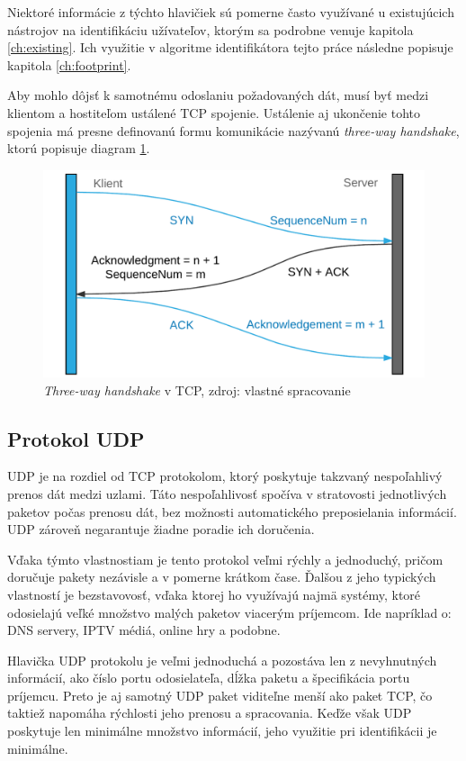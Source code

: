 \documentclass[
  digital, %
  table,   %
  lof,     %
  nolot,   %
  nocover
]{fithesis3}
\begin{document}
Niektoré informácie z týchto hlavičiek sú pomerne často využívané u existujúcich
nástrojov na identifikáciu užívateľov, ktorým sa podrobne venuje kapitola
\ref{ch:existing}. Ich využitie v algoritme identifikátora tejto práce následne
popisuje kapitola \ref{ch:footprint}.

Aby mohlo dôjsť k samotnému odoslaniu požadovaných dát, musí byť medzi klientom
a hostiteľom ustálené TCP spojenie. Ustálenie aj ukončenie tohto spojenia má
presne definovanú formu komunikácie nazývanú \textit{three-way handshake}, ktorú
popisuje diagram \ref{fig:net-tcp-flow}.

\begin{figure}[h]
  \centering
    \includegraphics[width=.95\textwidth]{images/net-tcp-flow.png}
  \caption{\textit{Three-way handshake} v TCP, zdroj: vlastné spracovanie}
  \label{fig:net-tcp-flow}
\end{figure}

\subsection{Protokol UDP}
UDP je na rozdiel od TCP protokolom, ktorý poskytuje takzvaný nespoľahlivý
prenos dát medzi uzlami. Táto nespoľahlivosť spočíva v stratovosti jednotlivých
paketov počas prenosu dát, bez možnosti automatického preposielania
informácií. UDP zároveň negarantuje žiadne poradie ich doručenia.

Vďaka týmto
vlastnostiam je tento protokol veľmi rýchly a jednoduchý, pričom doručuje
pakety nezávisle a v pomerne krátkom čase. Ďalšou z jeho typických vlastností
je bezstavovosť, vďaka ktorej ho využívajú najmä systémy, ktoré odosielajú
veľké množstvo malých paketov viacerým príjemcom. Ide napríklad o: DNS servery,
IPTV médiá, online hry a podobne.

Hlavička UDP protokolu je veľmi jednoduchá a pozostáva len z nevyhnutných
informácií, ako číslo portu odosielateľa, dĺžka paketu a špecifikácia portu
príjemcu. Preto je aj samotný UDP paket viditeľne menší ako paket TCP, čo
taktiež napomáha rýchlosti jeho prenosu a spracovania. Keďže však UDP poskytuje
len minimálne množstvo informácií, jeho využitie pri identifikácii je minimálne.
\end{document}
